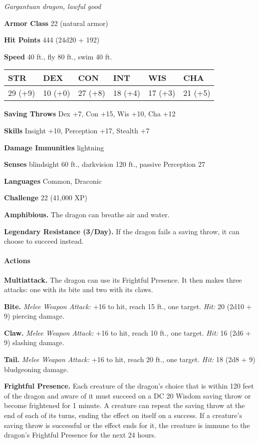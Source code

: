 \documentclass[
]{article}
\begin{document}
\emph{Gargantuan dragon, lawful good}

\textbf{Armor Class} 22 (natural armor)

\textbf{Hit Points} 444 (24d20 + 192)

\textbf{Speed} 40 ft., fly 80 ft., swim 40 ft.

\begin{longtable}[]{@{}llllll@{}}
\toprule
STR & DEX & CON & INT & WIS & CHA\tabularnewline
\midrule
\endhead
29 (+9) & 10 (+0) & 27 (+8) & 18 (+4) & 17 (+3) & 21 (+5)\tabularnewline
\bottomrule
\end{longtable}

\textbf{Saving Throws} Dex +7, Con +15, Wis +10, Cha +12

\textbf{Skills} Insight +10, Perception +17, Stealth +7

\textbf{Damage Immunities} lightning

\textbf{Senses} blindsight 60 ft., darkvision 120 ft., passive
Perception 27

\textbf{Languages} Common, Draconic

\textbf{Challenge} 22 (41,000 XP)

\textbf{Amphibious.} The dragon can breathe air and water.

\textbf{Legendary Resistance (3/Day).} If the dragon fails a saving
throw, it can choose to succeed instead.

\hypertarget{actions-47}{%
\paragraph{Actions}\label{actions-47}}

\textbf{Multiattack.} The dragon can use its Frightful Presence. It then
makes three attacks: one with its bite and two with its claws.

\textbf{Bite.} \emph{Melee Weapon Attack:} +16 to hit, reach 15 ft., one
target. \emph{Hit:} 20 (2d10 + 9) piercing damage.

\textbf{Claw.} \emph{Melee Weapon Attack:} +16 to hit, reach 10 ft., one
target. \emph{Hit:} 16 (2d6 + 9) slashing damage.

\textbf{Tail.} \emph{Melee Weapon Attack:} +16 to hit, reach 20 ft., one
target. \emph{Hit:} 18 (2d8 + 9) bludgeoning damage.

\textbf{Frightful Presence.} Each creature of the dragon's choice that
is within 120 feet of the dragon and aware of it must succeed on a DC 20
Wisdom saving throw or become frightened for 1 minute. A creature can
repeat the saving throw at the end of each of its turns, ending the
effect on itself on a success. If a creature's saving throw is
successful or the effect ends for it, the creature is immune to the
dragon's Frightful Presence for the next 24 hours.
\end{document}
